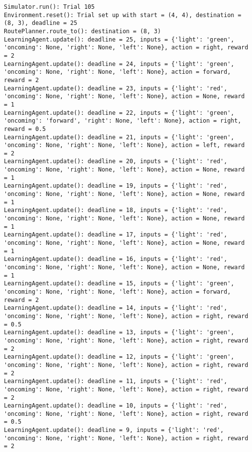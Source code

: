 \documentclass{article}
\begin{document}
\begin{verbatim}
Simulator.run(): Trial 105
Environment.reset(): Trial set up with start = (4, 4), destination = (8, 3), deadline = 25
RoutePlanner.route_to(): destination = (8, 3)
LearningAgent.update(): deadline = 25, inputs = {'light': 'green', 'oncoming': None, 'right': None, 'left': None}, action = right, reward = 2
LearningAgent.update(): deadline = 24, inputs = {'light': 'green', 'oncoming': None, 'right': None, 'left': None}, action = forward, reward = 2
LearningAgent.update(): deadline = 23, inputs = {'light': 'red', 'oncoming': None, 'right': None, 'left': None}, action = None, reward = 1
LearningAgent.update(): deadline = 22, inputs = {'light': 'green', 'oncoming': 'forward', 'right': None, 'left': None}, action = right, reward = 0.5
LearningAgent.update(): deadline = 21, inputs = {'light': 'green', 'oncoming': None, 'right': None, 'left': None}, action = left, reward = 2
LearningAgent.update(): deadline = 20, inputs = {'light': 'red', 'oncoming': None, 'right': None, 'left': None}, action = None, reward = 1
LearningAgent.update(): deadline = 19, inputs = {'light': 'red', 'oncoming': None, 'right': None, 'left': None}, action = None, reward = 1
LearningAgent.update(): deadline = 18, inputs = {'light': 'red', 'oncoming': None, 'right': None, 'left': None}, action = None, reward = 1
LearningAgent.update(): deadline = 17, inputs = {'light': 'red', 'oncoming': None, 'right': None, 'left': None}, action = None, reward = 1
LearningAgent.update(): deadline = 16, inputs = {'light': 'red', 'oncoming': None, 'right': None, 'left': None}, action = None, reward = 1
LearningAgent.update(): deadline = 15, inputs = {'light': 'green', 'oncoming': None, 'right': None, 'left': None}, action = forward, reward = 2
LearningAgent.update(): deadline = 14, inputs = {'light': 'red', 'oncoming': None, 'right': None, 'left': None}, action = right, reward = 0.5
LearningAgent.update(): deadline = 13, inputs = {'light': 'green', 'oncoming': None, 'right': None, 'left': None}, action = right, reward = 2
LearningAgent.update(): deadline = 12, inputs = {'light': 'green', 'oncoming': None, 'right': None, 'left': None}, action = right, reward = 2
LearningAgent.update(): deadline = 11, inputs = {'light': 'red', 'oncoming': None, 'right': None, 'left': None}, action = right, reward = 2
LearningAgent.update(): deadline = 10, inputs = {'light': 'red', 'oncoming': None, 'right': None, 'left': None}, action = right, reward = 0.5
LearningAgent.update(): deadline = 9, inputs = {'light': 'red', 'oncoming': None, 'right': None, 'left': None}, action = right, reward = 2

\end{verbatim}
\end{document}
